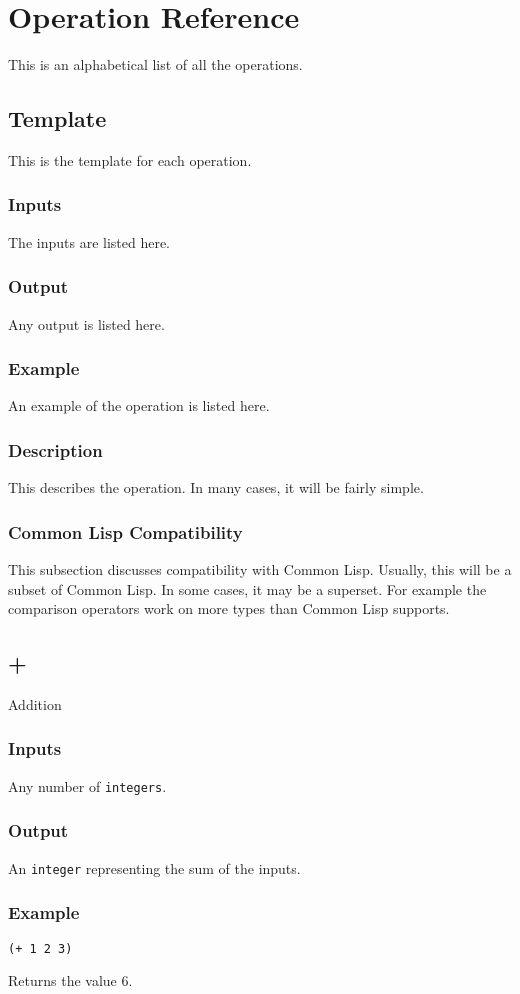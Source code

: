 \documentclass[10pt, openany]{book}
\newcommand{\datatype}[1]{\texttt{#1}}
\newcommand{\cl}{Common Lisp}
\begin{document}
\chapter{Operation Reference}
This is an alphabetical list of all the operations.
\section{Template}
This is the template for each operation.
\subsection{Inputs}
The inputs are listed here.
\subsection{Output}
Any output is listed here.
\subsection{Example}
An example of the operation is listed here.
\subsection{Description}
This describes the operation.  In many cases, it will be fairly simple.
\subsection{Common Lisp Compatibility}
This subsection discusses compatibility with \cl.  Usually, this will be a subset of \cl.  In some cases, it may be a superset.  For example the comparison operators work on more types than \cl{} supports.

\section{+}
Addition
\subsection{Inputs}
Any number of \datatype{integers}.
\subsection{Output}
An \datatype{integer} representing the sum of the inputs.
\subsection{Example}
\begin{lstlisting}
(+ 1 2 3)
\end{lstlisting}
Returns the value 6.
\end{document}

